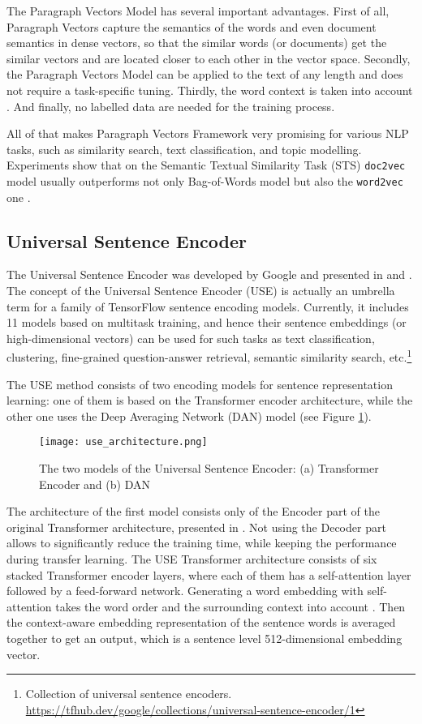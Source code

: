 \documentclass[fontsize=12pt,a4paper,twoside,openany]{scrbook}
\begin{document}
The Paragraph Vectors Model has several important advantages. First of all, Paragraph Vectors capture the semantics of the words and even document semantics in dense vectors, so that the similar words (or documents) get the similar vectors and are located closer to each other in the vector space. Secondly, the Paragraph Vectors Model can be applied to the text of any length and does not require a task-specific tuning. Thirdly, the word context is taken into account \parencite{Dai15}. And finally, no labelled data are needed for the training process. 

All of that makes Paragraph Vectors Framework very promising for various NLP tasks, such as similarity search, text classification, and topic modelling. Experiments show that on the Semantic Textual Similarity Task (STS) \verb|doc2vec| model usually outperforms not only Bag-of-Words model but also the \verb|word2vec| one \parencite[see][]{Lau16, Le14}.

\subsection{Universal Sentence Encoder}
\label{sec:muse}

The Universal Sentence Encoder was developed by Google and presented in \parencite{Cer18a} and \parencite{Cer18b}. The concept of the Universal Sentence Encoder (USE) is actually an umbrella term for a family of TensorFlow sentence encoding models. Currently, it includes 11 models based on multitask training, and hence their sentence embeddings (or high-dimensional vectors) can be used for such tasks as text classification, clustering,  fine-grained question-answer retrieval, semantic similarity search, etc.\footnote{Collection of universal sentence encoders. \url{https://tfhub.dev/google/collections/universal-sentence-encoder/1}}

The USE method consists of two encoding models for sentence representation learning: one of them is based on the Transformer encoder architecture, while the other one uses the Deep Averaging Network (DAN) model \parencite{Cer18a} (see Figure \ref{fig:use_architecture}).

\begin{figure}[h]
\centering
\texttt{[image: use\_architecture.png]}
\caption{The two models of the Universal Sentence Encoder: (a) Transformer Encoder and (b) DAN}
\label{fig:use_architecture}
\end{figure}

The architecture of the first model consists only of the Encoder part of the original Transformer architecture, presented in \parencite{Vaswani17}. Not using the Decoder part allows to significantly reduce the training time, while keeping the performance during transfer learning. The USE Transformer architecture consists of six stacked Transformer encoder layers, where each of them has a self-attention layer followed by a feed-forward network. Generating a word embedding with self-attention takes the word order and the surrounding context into account \parencite{Cer18a}. Then the context-aware embedding representation of the sentence words is averaged together to get an output, which is a sentence level 512-dimensional embedding vector. 
\end{document}
